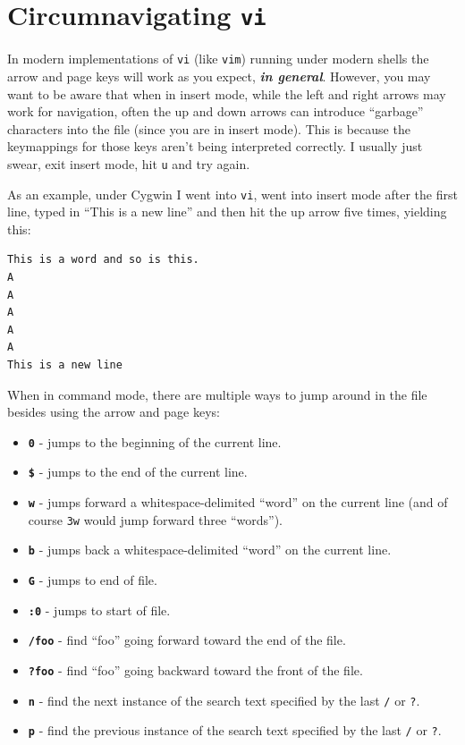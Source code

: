 \documentclass[10pt,]{book}
\numberwithin{figure}{chapter}
\begin{document}
\section{Circumnavigating \texttt{vi}}\label{circumnavigating-vi}

In modern implementations of \texttt{vi} (like \texttt{vim}) running
under modern shells the arrow and page keys will work as you expect,
\textbf{\emph{in general}}. However, you may want to be aware that when
in insert mode, while the left and right arrows may work for navigation,
often the up and down arrows can introduce ``garbage'' characters into
the file (since you are in insert mode). This is because the keymappings
for those keys aren't being interpreted correctly. I usually just swear,
exit insert mode, hit \texttt{u} and try again.

As an example, under Cygwin I went into \texttt{vi}, went into insert
mode after the first line, typed in ``This is a new line'' and then hit
the up arrow five times, yielding this:

\begin{verbatim}
This is a word and so is this.
A
A
A
A
A
This is a new line
\end{verbatim}

When in command mode, there are multiple ways to jump around in the file
besides using the arrow and page keys:

\begin{itemize}
\item
  \textbf{\texttt{0}} - jumps to the beginning of the current line.
\item
  \textbf{\texttt{\$}} - jumps to the end of the current line.
\item
  \textbf{\texttt{w}} - jumps forward a whitespace-delimited ``word'' on
  the current line (and of course \texttt{3w} would jump forward three
  ``words'').
\item
  \textbf{\texttt{b}} - jumps back a whitespace-delimited ``word'' on
  the current line.
\item
  \textbf{\texttt{G}} - jumps to end of file.
\item
  \textbf{\texttt{:0}} - jumps to start of file.
\item
  \textbf{\texttt{/foo}} - find ``foo'' going forward toward the end of
  the file.
\item
  \textbf{\texttt{?foo}} - find ``foo'' going backward toward the front
  of the file.
\item
  \textbf{\texttt{n}} - find the next instance of the search text
  specified by the last \texttt{/} or \texttt{?}.
\item
  \textbf{\texttt{p}} - find the previous instance of the search text
  specified by the last \texttt{/} or \texttt{?}.
\end{itemize}
\end{document}
